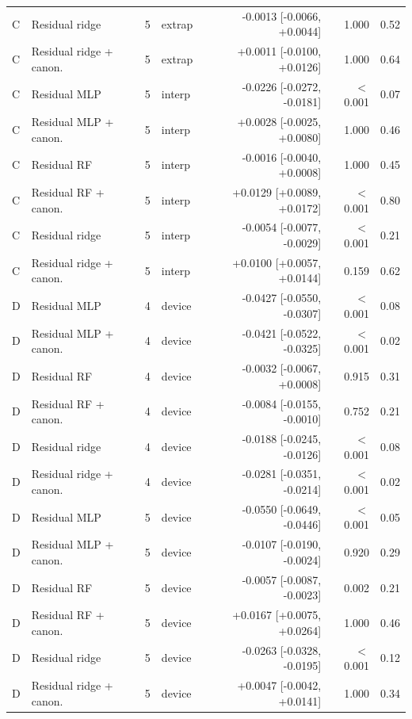 \begin{longtable}{llrlrrr}
C & Residual ridge & 5 & extrap & -0.0013 [-0.0066, +0.0044] & 1.000 & 0.52 \\
C & Residual ridge + canon. & 5 & extrap & +0.0011 [-0.0100, +0.0126] & 1.000 & 0.64 \\
C & Residual MLP & 5 & interp & -0.0226 [-0.0272, -0.0181] & $<$0.001 & 0.07 \\
C & Residual MLP + canon. & 5 & interp & +0.0028 [-0.0025, +0.0080] & 1.000 & 0.46 \\
C & Residual RF & 5 & interp & -0.0016 [-0.0040, +0.0008] & 1.000 & 0.45 \\
C & Residual RF + canon. & 5 & interp & +0.0129 [+0.0089, +0.0172] & $<$0.001 & 0.80 \\
C & Residual ridge & 5 & interp & -0.0054 [-0.0077, -0.0029] & $<$0.001 & 0.21 \\
C & Residual ridge + canon. & 5 & interp & +0.0100 [+0.0057, +0.0144] & 0.159 & 0.62 \\
D & Residual MLP & 4 & device & -0.0427 [-0.0550, -0.0307] & $<$0.001 & 0.08 \\
D & Residual MLP + canon. & 4 & device & -0.0421 [-0.0522, -0.0325] & $<$0.001 & 0.02 \\
D & Residual RF & 4 & device & -0.0032 [-0.0067, +0.0008] & 0.915 & 0.31 \\
D & Residual RF + canon. & 4 & device & -0.0084 [-0.0155, -0.0010] & 0.752 & 0.21 \\
D & Residual ridge & 4 & device & -0.0188 [-0.0245, -0.0126] & $<$0.001 & 0.08 \\
D & Residual ridge + canon. & 4 & device & -0.0281 [-0.0351, -0.0214] & $<$0.001 & 0.02 \\
D & Residual MLP & 5 & device & -0.0550 [-0.0649, -0.0446] & $<$0.001 & 0.05 \\
D & Residual MLP + canon. & 5 & device & -0.0107 [-0.0190, -0.0024] & 0.920 & 0.29 \\
D & Residual RF & 5 & device & -0.0057 [-0.0087, -0.0023] & 0.002 & 0.21 \\
D & Residual RF + canon. & 5 & device & +0.0167 [+0.0075, +0.0264] & 1.000 & 0.46 \\
D & Residual ridge & 5 & device & -0.0263 [-0.0328, -0.0195] & $<$0.001 & 0.12 \\
D & Residual ridge + canon. & 5 & device & +0.0047 [-0.0042, +0.0141] & 1.000 & 0.34 \\
\bottomrule
\end{longtable}